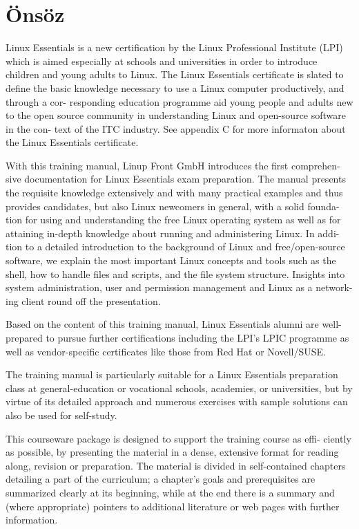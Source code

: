 \chapter*{Önsöz}

Linux Essentials is a new certification by the Linux Professional Institute (LPI) which is aimed especially at schools and universities in order to introduce children and young adults to Linux. The Linux Essentials certificate is slated to define the basic knowledge necessary to use a Linux computer productively, and through a cor- responding education programme aid young people and adults new to the open source community in understanding Linux and open-source software in the con- text of the ITC industry. See appendix C for more informaton about the Linux Essentials certificate.

With this training manual, Linup Front GmbH introduces the first comprehen- sive documentation for Linux Essentials exam preparation. The manual presents the requisite knowledge extensively and with many practical examples and thus provides candidates, but also Linux newcomers in general, with a solid founda- tion for using and understanding the free Linux operating system as well as for attaining in-depth knowledge about running and administering Linux. In addi- tion to a detailed introduction to the background of Linux and free/open-source software, we explain the most important Linux concepts and tools such as the shell, how to handle files and scripts, and the file system structure. Insights into system administration, user and permission management and Linux as a network- ing client round off the presentation.

Based on the content of this training manual, Linux Essentials alumni are well- prepared to pursue further certifications including the LPI’s LPIC programme as well as vendor-specific certificates like those from Red Hat or Novell/SUSE.

The training manual is particularly suitable for a Linux Essentials preparation class at general-education or vocational schools, academies, or universities, but by virtue of its detailed approach and numerous exercises with sample solutions can also be used for self-study.

This courseware package is designed to support the training course as effi- ciently as possible, by presenting the material in a dense, extensive format for reading along, revision or preparation. The material is divided in self-contained chapters detailing a part of the curriculum; a chapter’s goals and prerequisites are summarized clearly at its beginning, while at the end there is a summary and (where appropriate) pointers to additional literature or web pages with further information.

